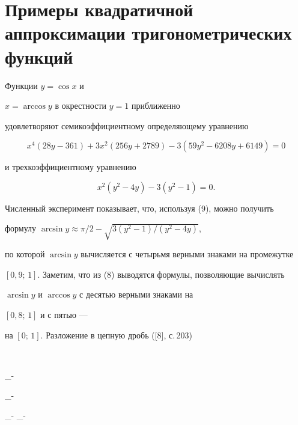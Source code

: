  


\section{Примеры квадратичной аппроксимации тригонометрических функций} 





Функции $y=\cos x$ и


$x=\arccos y$ в окрестности $y=1$ приближенно 


удовлетворяют семикоэффициентному определяющему уравнению


\begin{equation}


x^4(28y-361)+3x^2(256y+2789)-3(59y^2-6208y+6149)=0


\end{equation}


и трехкоэффициентному уравнению


\begin{equation}


x^2(y^2-4y)-3(y^2-1)=0.


\end{equation}


Численный эксперимент показывает, что, используя (9), можно получить 


формулу $\arcsin y\approx\pi/2-\sqrt{3(y^2-1)/(y^2-4y)}$, 


по которой $\arcsin y$ вычисляется с четырьмя верными знаками на промежутке 


$[0{,}9;\,1]$. Заметим, что из (8) выводятся формулы, позволяющие вычислять 


$\arcsin y$ и $\arccos y$ с десятью верными знаками на


$[0{,}8;\,1]$ и с пятью --- 


на $[0;\,1]$. Разложение в цепную дробь ([8], с.\,203) 


$$


\approx 


{\hspace*{3mm}}_{-}\hspace*{2mm} 


{\hspace*{3mm}}_{-}\hspace*{2mm} {\hspace*{3mm}} 


_{-}\hspace*{2mm} {\hspace*{3mm}}_{-}\hspace*{2mm} 


